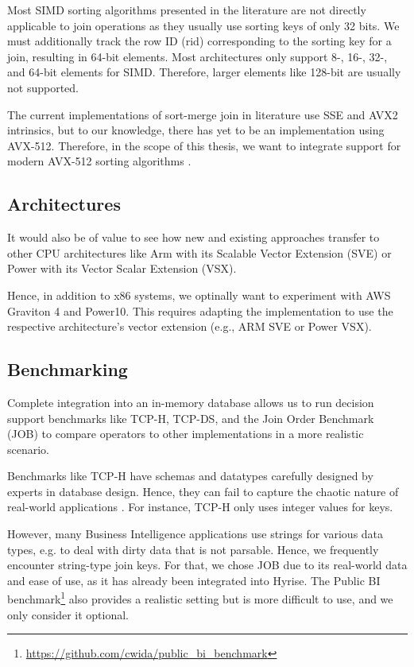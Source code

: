 Most SIMD sorting algorithms presented in the literature are not directly applicable to join
operations as they usually use sorting keys of only 32 bits. We must additionally track the row ID
(rid) corresponding to the sorting key for a join, resulting in 64-bit elements. Most architectures
only support 8-, 16-, 32-, and 64-bit elements for SIMD. Therefore, larger elements like 128-bit are
usually not supported.

The current implementations of sort-merge join in literature use SSE and AVX2 intrinsics, but to
our knowledge, there has yet to be an implementation using AVX-512. Therefore, in the scope of
this thesis, we want to integrate support for modern AVX-512 sorting algorithms \cite{Watkins, 8855628}. 

\subsection{Architectures}
It would also be of value to see how new and existing approaches transfer to other CPU
architectures like Arm with its Scalable Vector Extension (SVE) or Power with its Vector Scalar
Extension (VSX).

Hence, in addition to x86 systems, we optinally want to experiment with AWS Graviton 4
and Power10. This requires adapting 
the implementation to use the respective architecture's
vector extension (e.g., ARM SVE or Power VSX).


\subsection{Benchmarking}
Complete integration into an in-memory database allows us to run decision support benchmarks
like TCP-H, TCP-DS, and the Join Order Benchmark (JOB) \cite{DBLP:journals/pvldb/LeisGMBK015} to
compare operators to other implementations in a more realistic scenario.

Benchmarks like TCP-H have schemas and datatypes carefully designed by experts in database design.
Hence, they can fail to capture the chaotic nature of real-world applications \cite{10.1145/3209950.3209952}.
For instance, TCP-H only uses integer values for keys. 

However, many Business Intelligence applications use strings for various data types, e.g. to deal
with dirty data that is not parsable. Hence, we frequently encounter string-type join keys. For
that, we chose JOB due to its real-world data and ease of use, as it 
has already been integrated into Hyrise. The Public BI benchmark\footnote{\url{https://github.com/cwida/public_bi_benchmark}}
also provides a realistic setting
but is more difficult to use, and we only consider it optional.

